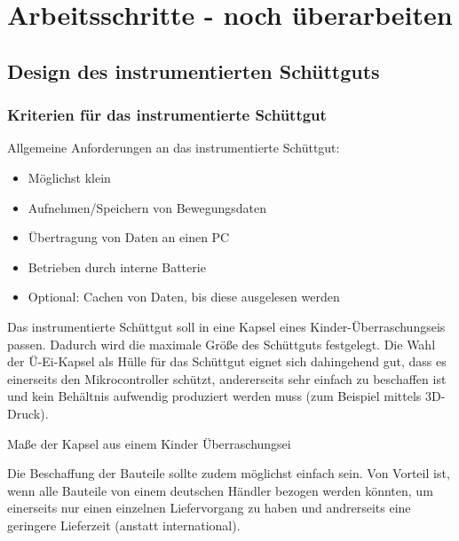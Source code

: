 {\large \section{Arbeitsschritte - noch überarbeiten}


\subsection{Design des instrumentierten Schüttguts}


\subsubsection*{Kriterien für das instrumentierte Schüttgut}

Allgemeine Anforderungen an das instrumentierte Schüttgut:

\begin{itemize}
	\item Möglichst klein %
	\item Aufnehmen/Speichern von Bewegungsdaten
	\item Übertragung von Daten an einen PC
	\item Betrieben durch interne Batterie
	\item Optional: Cachen von Daten, bis diese ausgelesen werden 
\end{itemize}

Das instrumentierte Schüttgut soll in eine Kapsel eines Kinder-Überraschungseis passen. Dadurch wird die maximale Größe des Schüttguts festgelegt. Die Wahl der Ü-Ei-Kapsel als Hülle für das Schüttgut eignet sich dahingehend gut, dass es einerseits den Mikrocontroller schützt, andererseits sehr einfach zu beschaffen ist und kein Behältnis aufwendig produziert werden muss (zum Beispiel mittels 3D-Druck).

Maße der Kapsel aus einem Kinder Überraschungsei

Die Beschaffung der Bauteile sollte zudem möglichst einfach sein. Von Vorteil ist, wenn alle Bauteile von einem deutschen Händler bezogen werden könnten, um einerseits nur einen einzelnen Liefervorgang zu haben und andrerseits eine geringere Lieferzeit (anstatt international).

}
